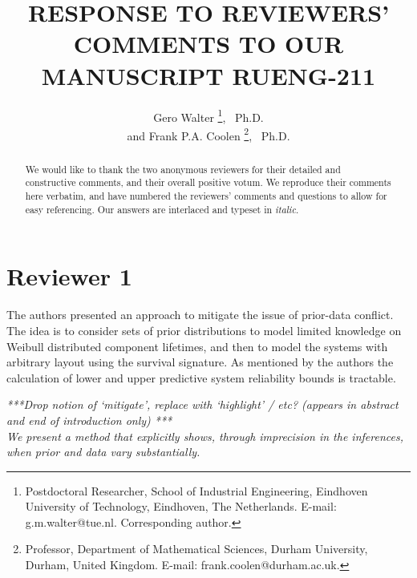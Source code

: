 \documentclass[Journal,SectionNumbers,SingleSpace,InsideFigs]{ascelike}
\begin{document}
\title{RESPONSE TO REVIEWERS' COMMENTS TO OUR MANUSCRIPT RUENG-211}

\author{
Gero Walter%
\thanks{
Postdoctoral Researcher,
School of Industrial Engineering,
Eindhoven University of Technology, Eindhoven, The Netherlands.
E-mail: g.m.walter@tue.nl. Corresponding author.},
\ Ph.D.
\\
and
Frank P.A. Coolen%
\thanks{
Professor,
Department of Mathematical Sciences,
Durham University, Durham, United Kingdom.
E-mail: frank.coolen@durham.ac.uk.},
\ Ph.D.
}

\maketitle

\begin{abstract}
We would like to thank the two anonymous reviewers for their detailed and constructive comments,
and their overall positive votum.
We reproduce their comments here verbatim,
and have numbered the reviewers' comments and questions to allow for easy referencing. 
Our answers are interlaced and typeset in \emph{italic}.
\end{abstract}


\section*{Reviewer 1}

The authors presented an approach to mitigate the issue of prior-data conflict.
The idea is to consider sets of prior distributions to model limited knowledge on Weibull distributed component lifetimes,
and then to model the systems with arbitrary layout using the survival signature.
As mentioned by the authors the calculation of lower and upper predictive system reliability bounds is tractable.

\smallskip

\emph{***Drop notion of `mitigate', replace with `highlight' / etc? (appears in abstract and end of introduction only) ***\\
We present a method that explicitly shows, through imprecision in the inferences, when prior and data vary substantially.}
\end{document}
